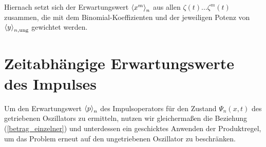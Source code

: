     Hiernach setzt sich der Erwartungswert $\braket{x^m}_n$ aus allen $\zeta(t)...\zeta^m(t)$ zusammen, die mit dem Binomial-Koeffizienten und der jeweiligen Potenz von $\braket{y}_{n,\text{ung}}$ gewichtet werden.







  \section{Zeitabhängige Erwartungswerte des Impulses}
    Um den Erwartungswert $\braket{p}_n$ des Impulsoperators für den Zustand $\Psi_n(x,t)$ des getriebenen Oszillators zu ermitteln, nutzen wir gleichermaßen die Beziehung (\ref{betrag_einzelner}) und unterdessen ein geschicktes Anwenden der Produktregel, um das Problem erneut auf den ungetriebenen Oszillator zu beschränken.

